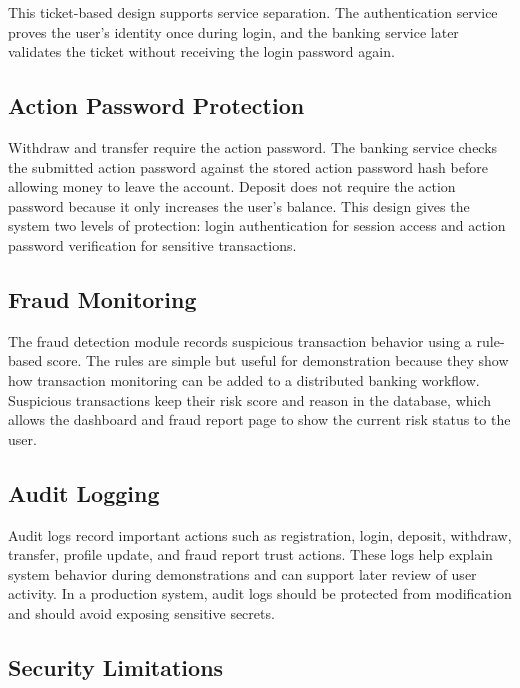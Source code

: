 \documentclass[12pt,a4paper]{article}
\newcommand{\subsectionbreakguard}{\Needspace{5\baselineskip}}
\begin{document}
This ticket-based design supports service separation. The authentication service proves the user's identity once during login, and the banking service later validates the ticket without receiving the login password again.

\subsectionbreakguard
\subsection{Action Password Protection}

Withdraw and transfer require the action password. The banking service checks the submitted action password against the stored action password hash before allowing money to leave the account. Deposit does not require the action password because it only increases the user's balance. This design gives the system two levels of protection: login authentication for session access and action password verification for sensitive transactions.

\subsectionbreakguard
\subsection{Fraud Monitoring}

The fraud detection module records suspicious transaction behavior using a rule-based score. The rules are simple but useful for demonstration because they show how transaction monitoring can be added to a distributed banking workflow. Suspicious transactions keep their risk score and reason in the database, which allows the dashboard and fraud report page to show the current risk status to the user.

\subsectionbreakguard
\subsection{Audit Logging}

Audit logs record important actions such as registration, login, deposit, withdraw, transfer, profile update, and fraud report trust actions. These logs help explain system behavior during demonstrations and can support later review of user activity. In a production system, audit logs should be protected from modification and should avoid exposing sensitive secrets.

\subsectionbreakguard
\subsection{Security Limitations}
\end{document}
